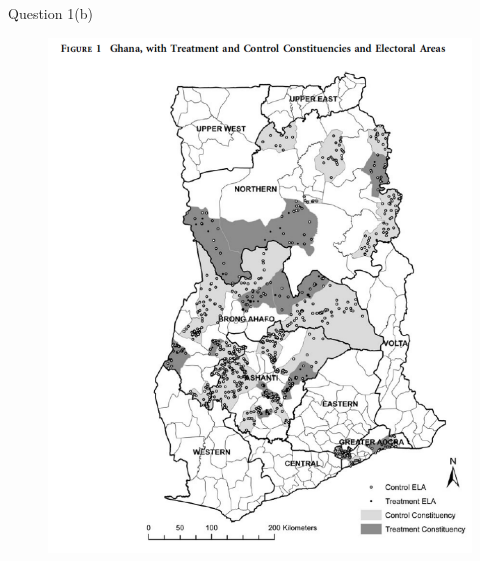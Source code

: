 \documentclass[xcolor=table,dvipsnames]{beamer}
\begin{document}
\begin{frame}{Question 1(b)}
\begin{figure}[H]\centering
\includegraphics[scale=.25]{pictures/ichinoSchuendeln_map.pdf}
\end{figure}
\end{frame}
\end{document}

